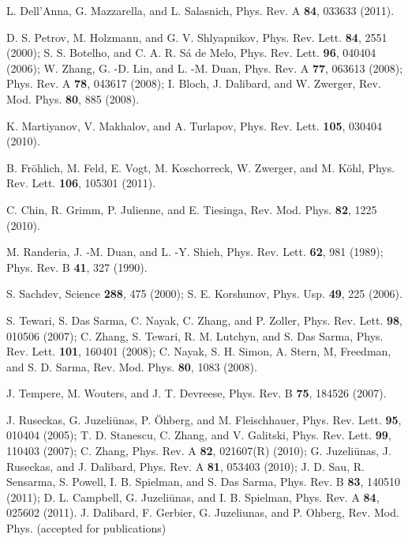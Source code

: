 \documentclass[pra,print,showpacs,superscriptaddress,twocolumn]{revtex4}
\begin{document}
\begin{thebibliography}{99}
 L. Dell'Anna, G. Mazzarella, and L. Salasnich, Phys. Rev. A
\textbf{84}, 033633 (2011).

 D. S. Petrov, M. Holzmann, and G. V. Shlyapnikov, Phys. Rev.
Lett. \textbf{84}, 2551 (2000); S. S. Botelho, and C. A. R. S\'{a} de Melo,
Phys. Rev. Lett. \textbf{96}, 040404 (2006); W. Zhang, G. -D. Lin, and L.
-M. Duan, Phys. Rev. A \textbf{77}, 063613 (2008); Phys. Rev. A \textbf{78},
043617 (2008); I. Bloch, J. Dalibard, and W. Zwerger, Rev. Mod. Phys.
\textbf{80}, 885 (2008).

 K. Martiyanov, V. Makhalov, and A. Turlapov, Phys. Rev.
Lett. \textbf{105}, 030404 (2010).

 B. Fr\"{o}hlich, M. Feld, E. Vogt, M. Koschorreck, W. Zwerger,
and M. K\"{o}hl, Phys. Rev. Lett. \textbf{106}, 105301 (2011).

 C. Chin, R. Grimm, P. Julienne, and E. Tiesinga, Rev. Mod.
Phys. \textbf{82}, 1225 (2010).

 M. Randeria, J. -M. Duan, and L. -Y. Shieh, Phys. Rev. Lett.
\textbf{62}, 981 (1989); Phys. Rev. B \textbf{41}, 327 (1990).

 S. Sachdev, Science \textbf{288}, 475 (2000); S. E.
Korshunov, Phys. Usp. \textbf{49}, 225 (2006).

 S. Tewari, S. Das Sarma, C. Nayak, C. Zhang, and P. Zoller,
Phys. Rev. Lett. \textbf{98}, 010506 (2007); C. Zhang, S. Tewari, R. M.
Lutchyn, and S. Das Sarma, Phys. Rev. Lett. \textbf{101}, 160401 (2008); C.
Nayak, S. H. Simon, A. Stern, M, Freedman, and S. D. Sarma, Rev. Mod. Phys.
\textbf{80}, 1083 (2008).

 J. Tempere, M. Wouters, and J. T. Devreese, Phys. Rev. B
\textbf{75}, 184526 (2007).

 J. Ruseckas, G. Juzeli\={u}nas, P. \"{O}hberg, and M.
Fleischhauer, Phys. Rev. Lett. \textbf{95}, 010404 (2005); T. D. Stanescu,
C. Zhang, and V. Galitski, Phys. Rev. Lett. \textbf{99}, 110403 (2007);\quad
C. Zhang, Phys. Rev. A \textbf{82}, 021607(R) (2010); G. Juzeli\={u}nas, J.
Ruseckas, and J. Dalibard, Phys. Rev. A \textbf{81}, 053403 (2010); J. D.
Sau, R. Sensarma, S. Powell, I. B. Spielman, and S. Das Sarma, Phys. Rev. B
\textbf{83}, 140510 (2011); D. L. Campbell, G. Juzeli\={u}nas, and I. B.
Spielman, Phys. Rev. A \textbf{84}, 025602 (2011). J. Dalibard, F. Gerbier,
G. Juzeliunas, and P. Ohberg, Rev. Mod. Phys. (accepted for publications)


\end{thebibliography}
\end{document}
